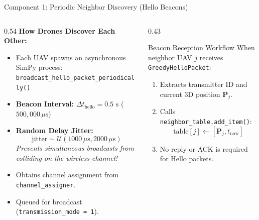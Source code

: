 \documentclass[aspectratio=169,10pt]{beamer}
\begin{document}
\begin{frame}{Component 1: Periodic Neighbor Discovery (Hello Beacons)}
  \begin{columns}[T]
    \begin{column}{0.54\textwidth}
      \textbf{How Drones Discover Each Other:}
      \begin{itemize}\setlength{\itemsep}{0.35em}
        \item Each UAV spawns an asynchronous SimPy process:
          \texttt{broadcast\_hello\_packet\_periodically()}
        \item \textbf{Beacon Interval:} $\Delta t_{\text{hello}} = 0.5\text{ s}$ ($500,000\,\mu\text{s}$)
        \item \textbf{Random Delay Jitter:}
          \begin{equation*}
            \text{jitter} \sim \mathcal{U}(1000\,\mu\text{s}, 2000\,\mu\text{s})
          \end{equation*}
          \textit{Prevents simultaneous broadcasts from colliding on the wireless channel!}
        \item Obtains channel assignment from \texttt{channel\_assigner}.
        \item Queued for broadcast (\texttt{transmission\_mode = 1}).
      \end{itemize}
    \end{column}

    \begin{column}{0.43\textwidth}
      \begin{exampleblock}{Beacon Reception Workflow}
        \small
        When neighbor UAV $j$ receives \texttt{GreedyHelloPacket}:
        \begin{enumerate}\setlength{\itemsep}{0.35em}
          \item Extracts transmitter ID and current 3D position $\mathbf{P}_j$.
          \item Calls \texttt{neighbor\_table.add\_item()}:
            \begin{equation*}
              \text{table}[j] \leftarrow [\mathbf{P}_j, t_{\text{now}}]
            \end{equation*}
          \item No reply or ACK is required for Hello packets.
        \end{enumerate}
      \end{exampleblock}
    \end{column}
  \end{columns}
\end{frame}
\end{document}
